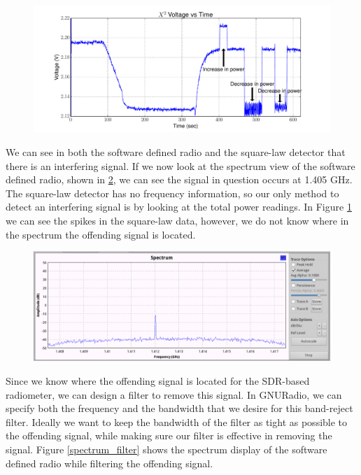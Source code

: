 {\begin{figure}[h!tb] \centering
\includegraphics[width=\textwidth]{Experiments/Exp4/x2_voltage.pdf}
\label{x2_unfilt_signal}
\end{figure}

We can see in both the software defined radio and the square-law detector that there is an interfering signal.  If we now look at the spectrum view of the software defined radio, shown in \ref{spectrum_interfering}, we can see the signal in question occurs  at 1.405 GHz.  The square-law detector has no frequency information, so our only method to detect an interfering signal is by looking at the total power readings.  In Figure \ref{x2_unfilt_signal} we can see the spikes in the square-law data, however, we do not know where in the spectrum the offending signal is located.

\begin{figure}[h!tb] \centering
\includegraphics[width=\textwidth]{Images/spectrum_interference.png}
\label{spectrum_interfering}
\end{figure}

Since we know where the offending signal is located for the SDR-based radiometer, we can design a filter to remove this signal.  In GNURadio, we can specify both the frequency and the bandwidth that we desire for this band-reject filter.  Ideally we want to keep the bandwidth of the filter as tight as possible to the offending signal, while making sure our filter is effective in removing the signal.  Figure \ref{spectrum_filter} shows the spectrum display of the software defined radio while filtering the offending signal.

}
